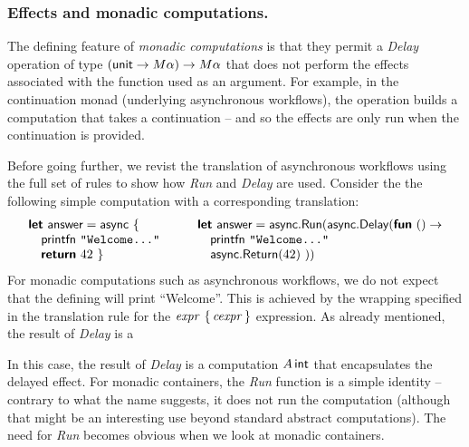 \documentclass[runningheads,a4paper]{llncs}
\begin{document}
\vspace{-1em}
\subsubsection{Effects and monadic computations.} The defining feature of \emph{monadic computations}
is that they permit a \emph{Delay} operation of type $(\textnormal{\sffamily unit} \rightarrow M\alpha) \rightarrow M\alpha$
that does not perform the effects associated with the function used as an argument.
For example, in the continuation monad (underlying asynchronous workflows), the operation builds 
a computation that takes a continuation -- and so the effects are only run when the continuation
is provided.

Before going further, we revist the translation of asynchronous workflows using the full set of
rules to show how \emph{Run} and \emph{Delay} are used. Consider the the following simple computation
with a corresponding translation:
%
\begin{equation*}
\begin{array}{l}
\kvd{let}~\ident{answer} = \ident{async}~\{\\
\quad \ident{printfn}~ \texttt{"Welcome..."}\\
\quad \kvd{return}~ 42 ~\}
\end{array}
\qquad
\begin{array}{l}
\kvd{let}~\ident{answer} = \ident{async}.\ident{Run}(\ident{async}.\ident{Delay}(\kvd{fun}~()\rightarrow\\
\quad \ident{printfn}~ \texttt{"Welcome..."}\\
\quad \ident{async}.\ident{Return}(42)~))
\end{array}
\end{equation*}
%
For monadic computations such as asynchronous workflows, we do not expect that the defining
 will print ``Welcome''. This is achieved by the wrapping specified in the 
translation rule for the $\textnormal{\emph{expr}}~\{\,\textnormal{\emph{cexpr}}\,\}$ expression. As already mentioned, the result
of \emph{Delay} is a 

In this case, the result of \emph{Delay} is a computation $A\,\textnormal{\sffamily int}$ that encapsulates the
delayed effect. For monadic containers, the \emph{Run} function is a simple identity -- contrary
to what the name suggests, it does not run the computation (although that might be an interesting
use beyond standard abstract computations). The need for \emph{Run} becomes obvious when we look
at monadic containers.

\vspace{-1em}
\end{document}
